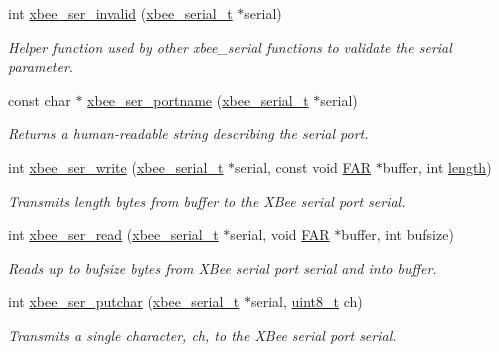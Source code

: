 \begin{DoxyCompactItemize}
\item 
int \hyperlink{group__hal__dos_ga3c79f6b72b6cfc3cc5c4524450f661b9}{xbee\-\_\-ser\-\_\-invalid} (\hyperlink{structxbee__serial__t}{xbee\-\_\-serial\-\_\-t} $\ast$serial)
\begin{DoxyCompactList}\small\item\em Helper function used by other xbee\-\_\-serial functions to validate the {\itshape serial} parameter. \end{DoxyCompactList}\item 
const char $\ast$ \hyperlink{group__hal__dos_ga898057d1b7645785e7f3d6256828d039}{xbee\-\_\-ser\-\_\-portname} (\hyperlink{structxbee__serial__t}{xbee\-\_\-serial\-\_\-t} $\ast$serial)
\begin{DoxyCompactList}\small\item\em Returns a human-\/readable string describing the serial port. \end{DoxyCompactList}\item 
int \hyperlink{group__hal__dos_ga2ca4e60c9d642084afa52dff9e1f6be4}{xbee\-\_\-ser\-\_\-write} (\hyperlink{structxbee__serial__t}{xbee\-\_\-serial\-\_\-t} $\ast$serial, const void \hyperlink{group__hal_gaef060b3456fdcc093a7210a762d5f2ed}{F\-A\-R} $\ast$buffer, int \hyperlink{group__zdo_gab2b3adeb2a67e656ff030b56727fd0ac}{length})
\begin{DoxyCompactList}\small\item\em Transmits {\itshape length} bytes from {\itshape buffer} to the X\-Bee serial port {\itshape serial}. \end{DoxyCompactList}\item 
int \hyperlink{group__hal__dos_ga8263312373c03a79a718142e051b3342}{xbee\-\_\-ser\-\_\-read} (\hyperlink{structxbee__serial__t}{xbee\-\_\-serial\-\_\-t} $\ast$serial, void \hyperlink{group__hal_gaef060b3456fdcc093a7210a762d5f2ed}{F\-A\-R} $\ast$buffer, int bufsize)
\begin{DoxyCompactList}\small\item\em Reads up to {\itshape bufsize} bytes from X\-Bee serial port {\itshape serial} and into {\itshape buffer}. \end{DoxyCompactList}\item 
int \hyperlink{group__hal__dos_ga86fea2345efb8bf9424228f0979b1849}{xbee\-\_\-ser\-\_\-putchar} (\hyperlink{structxbee__serial__t}{xbee\-\_\-serial\-\_\-t} $\ast$serial, \hyperlink{group__hal_gae1affc9ca37cfb624959c866a73f83c2}{uint8\-\_\-t} ch)
\begin{DoxyCompactList}\small\item\em Transmits a single character, {\itshape ch}, to the X\-Bee serial port {\itshape serial}. \end{DoxyCompactList}\item 

\end{DoxyCompactItemize}
